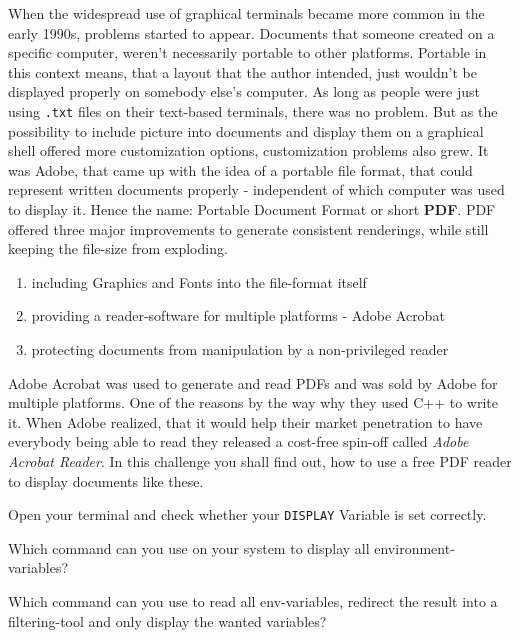 \begin{challenge}
    \begin{chadescription}
    When the widespread use of graphical terminals became more common in the early 1990s, problems started to appear. Documents that someone created on a specific computer, weren't necessarily portable to other platforms. Portable in this context means, that a layout that the author intended, just wouldn't be displayed properly on somebody else's computer. As long as people were just using \texttt{.txt} files on their text-based terminals, there was no problem. But as the possibility to include picture into documents and display them on a graphical shell offered more customization options, customization problems also grew. It was Adobe, that came up with the idea of a portable file format, that could represent written documents properly - independent of which computer was used to display it. Hence the name: Portable Document Format or short \textbf{PDF}. PDF offered three major improvements to generate consistent renderings, while still keeping the file-size from exploding.
    \begin{enumerate}
        \item including Graphics and Fonts into the file-format itself
        \item providing a reader-software for multiple platforms - Adobe Acrobat
        \item protecting documents from manipulation by a non-privileged reader
    \end{enumerate}
    Adobe Acrobat was used to generate and read PDFs and was sold by Adobe for multiple platforms. One of the reasons by the way why they used C++ to write it. When Adobe realized, that it would help their market penetration to have everybody being able to read they released a cost-free spin-off called \textit{Adobe Acrobat Reader}. In this challenge you shall find out, how to use a free PDF reader to display documents like these.
    \end{chadescription}
    \begin{task}
    Open your terminal and check whether your \texttt{DISPLAY} Variable is set correctly.
    \begin{questions}
        \item Which command can you use on your system to display all environment-variables?
        \item Which command can you use to read all env-variables, redirect the result into a filtering-tool and only display the wanted variables?

\end{questions}
\end{task}
\end{challenge}
